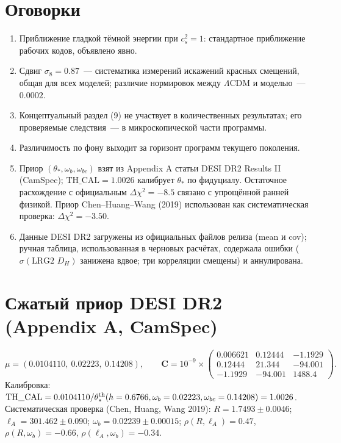 \documentclass[11pt,a4paper]{article}
\begin{document}
\section{Оговорки}
\begin{enumerate}
\item Приближение гладкой тёмной энергии при $c_s^2=1$: стандартное приближение рабочих кодов, объявлено явно.
\item Сдвиг $\sigma_8=0.87$~--- систематика измерений искажений красных смещений, общая для всех моделей; различие нормировок между $\Lambda$CDM и моделью~--- $0.0002$.
\item Концептуальный раздел (9) не участвует в количественных результатах; его проверяемые следствия~--- в микроскопической части программы.
\item Различимость по фону выходит за горизонт программ текущего поколения.
\item Приор $(\theta_*,\omega_b,\omega_{bc})$ взят из Appendix A статьи DESI DR2 Results II (CamSpec); $\mathrm{TH\_CAL}=1.0026$ калибрует $\theta_*$ по фидуциалу. Остаточное расхождение с официальным $\Delta\chi^2=-8.5$ связано с упрощённой ранней физикой. Приор Chen--Huang--Wang (2019) использован как систематическая проверка: $\Delta\chi^2=-3.50$.
\item Данные DESI DR2 загружены из официальных файлов релиза (mean и cov); ручная таблица, использованная в черновых расчётах, содержала ошибки ($\sigma(\text{LRG2 }D_H)$ занижена вдвое; три корреляции смещены) и аннулирована.
\end{enumerate}

\appendix
\section{Сжатый приор DESI DR2 (Appendix A, CamSpec)}
\label{app:priors}
\[
\mu=(0.0104110,\ 0.02223,\ 0.14208),\qquad
\mathbf{C}=10^{-9}\times\begin{pmatrix}
0.006621 & 0.12444 & -1.1929\\
0.12444 & 21.344 & -94.001\\
-1.1929 & -94.001 & 1488.4
\end{pmatrix}.
\]
Калибровка: $\mathrm{TH\_CAL}=0.0104110/\theta_*^{\rm th}(h=0.6766,\omega_b=0.02223,\omega_{bc}=0.14208)=1.0026$.
Систематическая проверка (Chen, Huang, Wang 2019): $R=1.7493\pm0.0046$; $\ell_A=301.462\pm0.090$; $\omega_b=0.02239\pm0.00015$; $\rho(R,\ell_A)=0.47$, $\rho(R,\omega_b)=-0.66$, $\rho(\ell_A,\omega_b)=-0.34$.
\end{document}
